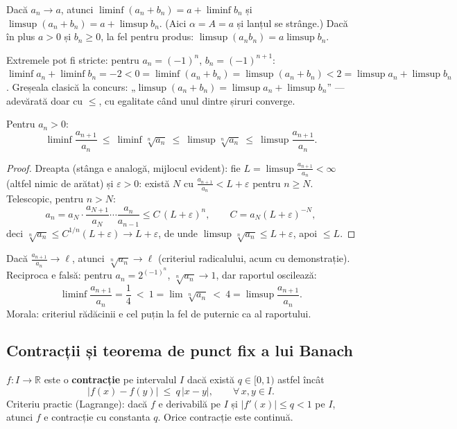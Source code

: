 \begin{corolar}
Dacă $a_n\to a$, atunci $\liminf(a_n+b_n)=a+\liminf b_n$ și $\limsup(a_n+b_n)=a+\limsup b_n$. (Aici $\alpha=A=a$ și lanțul se strânge.) Dacă în plus $a>0$ și $b_n\ge0$, la fel pentru produs: $\limsup(a_nb_n)=a\limsup b_n$.
\end{corolar}

\begin{obs}
Extremele pot fi stricte: pentru $a_n=(-1)^n$, $b_n=(-1)^{n+1}$: $\liminf a_n+\liminf b_n=-2<0=\liminf(a_n+b_n)=\limsup(a_n+b_n)<2=\limsup a_n+\limsup b_n$. Greșeala clasică la concurs: „$\limsup(a_n+b_n)=\limsup a_n+\limsup b_n$'' --- adevărată doar cu $\le$, cu egalitate când unul dintre șiruri converge.
\end{obs}

\begin{teorema}
Pentru $a_n>0$:
\[
\liminf\frac{a_{n+1}}{a_n}\ \le\ \liminf\sqrt[n]{a_n}\ \le\ \limsup\sqrt[n]{a_n}\ \le\ \limsup\frac{a_{n+1}}{a_n}.
\]
\end{teorema}
\begin{proof}
Dreapta (stânga e analogă, mijlocul evident): fie $L=\limsup\frac{a_{n+1}}{a_n}<\infty$ (altfel nimic de arătat) și $\varepsilon>0$: există $N$ cu $\frac{a_{n+1}}{a_n}<L+\varepsilon$ pentru $n\ge N$. Telescopic, pentru $n>N$:
\[
a_n=a_N\cdot\frac{a_{N+1}}{a_N}\cdots\frac{a_n}{a_{n-1}}\le C\,(L+\varepsilon)^n,\qquad C=a_N(L+\varepsilon)^{-N},
\]
deci $\sqrt[n]{a_n}\le C^{1/n}(L+\varepsilon)\to L+\varepsilon$, de unde $\limsup\sqrt[n]{a_n}\le L+\varepsilon$, apoi $\le L$.
\end{proof}

\begin{corolar}
Dacă $\frac{a_{n+1}}{a_n}\to\ell$, atunci $\sqrt[n]{a_n}\to\ell$ (criteriul radicalului, acum cu demonstrație). Reciproca e falsă: pentru $a_n=2^{(-1)^n}$, $\sqrt[n]{a_n}\to1$, dar raportul oscilează:
\[
\liminf\frac{a_{n+1}}{a_n}=\frac14\ <\ 1=\lim\sqrt[n]{a_n}\ <\ 4=\limsup\frac{a_{n+1}}{a_n}.
\]
Morala: criteriul rădăcinii e cel puțin la fel de puternic ca al raportului.
\end{corolar}

\subsection{Contracții și teorema de punct fix a lui Banach}

\begin{definitie}
$f:I\to\mathbb{R}$ este o \textbf{contracție} pe intervalul $I$ dacă există $q\in[0,1)$ astfel încât
\[
|f(x)-f(y)|\ \le\ q\,|x-y|,\qquad\forall\,x,y\in I.
\]
Criteriu practic (Lagrange): dacă $f$ e derivabilă pe $I$ și $|f'(x)|\le q<1$ pe $I$, atunci $f$ e contracție cu constanta $q$. Orice contracție este continuă.
\end{definitie}

